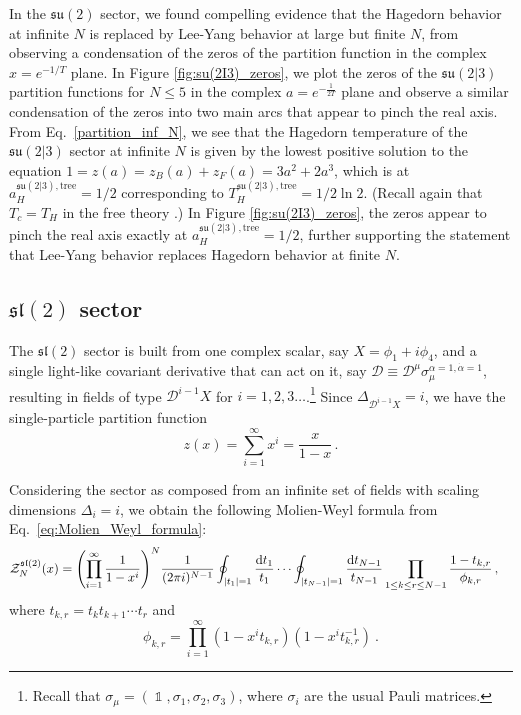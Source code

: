 \documentclass[a4paper,11pt]{article}
\DeclareMathOperator{\idm}{\mathds{1}}
\begin{document}
In the $\mathfrak{su}(2)$ sector, we found compelling evidence that the Hagedorn behavior at infinite $N$ is replaced by Lee-Yang behavior at large but finite $N$, from observing a condensation of the zeros of the partition function in the complex $x=e^{-1/T}$ plane. In Figure \ref{fig:su(2I3)_zeros}, we plot the zeros of the $\mathfrak{su}(2|3)$ partition functions for $N\leq 5$ in the complex $a=e^{-\frac{1}{2T}}$ plane and observe a similar condensation of the zeros into two main arcs that appear to pinch the real axis.
From Eq.\ \eqref{partition_inf_N}, we see that the Hagedorn temperature of the $\mathfrak{su}(2|3)$ sector at infinite $N$ is given by the lowest positive solution to the equation $1=z(a)=z_B(a)+z_F(a)=3a^2+2a^3$, which is at $a_H^{\mathfrak{su}(2|3),\text{tree}}=1/2$ corresponding to $T_H^{\mathfrak{su}(2|3),\text{tree}} = 1/2\ln 2$. 
(Recall again that $T_c=T_H$ in the free theory \cite{Aharony:2003sx}.)
In Figure \ref{fig:su(2I3)_zeros}, the zeros appear to pinch the real axis exactly at $a_H^{\mathfrak{su}(2|3),\text{tree}}=1/2$, further supporting the statement that Lee-Yang behavior replaces Hagedorn behavior at finite $N$.


\subsection{\texorpdfstring{$\mathfrak{sl}(2)$}{sl(2)} sector}
\label{subsec: sl(2)}


The $\mathfrak{sl}(2)$ sector is built from one complex scalar, say $X=\phi_1+i\phi_4$, and a single light-like covariant derivative that can act on it, say $\mathcal{D}\equiv \mathcal{D}^{\mu}\sigma_{\mu}^{\alpha=1,\dot\alpha=1}$, resulting in fields of type $\mathcal{D}^{i-1}X$ for $i=1,2,3\dots$.\footnote{Recall that $\sigma_{\mu}=(\idm,\sigma_1,\sigma_2,\sigma_3)$, where $\sigma_i$ are the usual Pauli matrices.}
Since $\Delta_{\mathcal{D}^{i-1}X}=i$, we have the single-particle partition function
\begin{equation}
	z(x)= \sum_{i=1}^\infty x^i = \frac{x}{1-x}  \, .
\end{equation}

Considering the sector as composed from an infinite set of fields with scaling dimensions $\Delta_i = i$, we obtain the following Molien-Weyl formula from Eq.\ \eqref{eq:Molien_Weyl_formula}:
\begin{equation} \label{eq:Molien_Weyl_sl(2)}
\begin{split}
	\mathcal{Z}_N^{\mathfrak{sl}(2)}(x) &= \qty(\prod_{i=1}^\infty\frac{1}{1-x^i})^N  
	 \frac{1}{(2\pi i)^{N-1}}\oint_{|t_1|=1} \frac{\dd t_1}{t_1} \cdots \oint_{|t_{N-1}|=1} \frac{\dd t_{N-1}}{t_{N-1}}  \prod_{1\leq k\leq r\leq N-1} \frac{1-t_{k,r}}{\phi_{k,r}} \,,
\end{split}
\end{equation}
where $t_{k,r}=t_k t_{k+1}\cdots t_r$ and
\begin{equation}
	\phi_{k,r} = \prod_{i=1}^\infty(1-x^it_{k,r})(1-x^it_{k,r}^{-1}) \ .
\end{equation}
\end{document}
